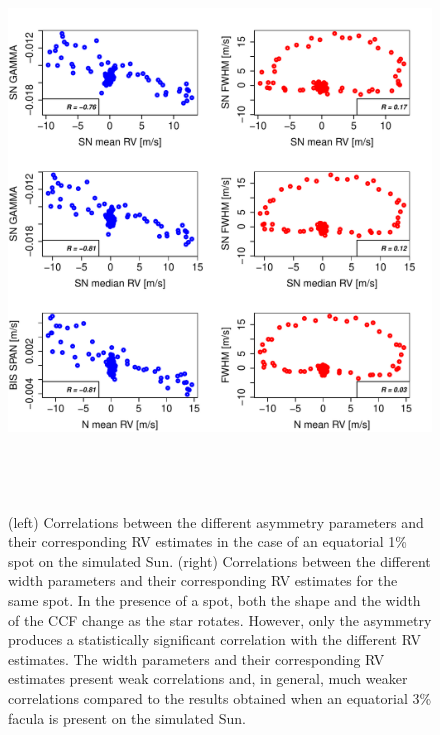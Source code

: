 \documentclass{aa}
\begin{document}
\begin{figure}[htbp]
\begin{center}
\includegraphics[height = 6in]{SOAP_SPOT_Comparison_para_SN_woithNoise.pdf} 
   \caption{(left) Correlations between the different asymmetry parameters and their corresponding RV estimates in the case of an equatorial 1\% spot on the simulated Sun. (right) Correlations between the different width parameters and their corresponding RV estimates for the same spot. In the presence of a spot, both the shape and the width of the CCF change as the star rotates. However, only the asymmetry produces a statistically significant correlation with the different RV estimates. The width parameters and their corresponding RV estimates present weak correlations and, in general, much weaker correlations compared to the results obtained when an equatorial 3\% facula is present on the simulated Sun.}
    \label{fig:spot.corr}
\end{center}
\end{figure}
\end{document}

